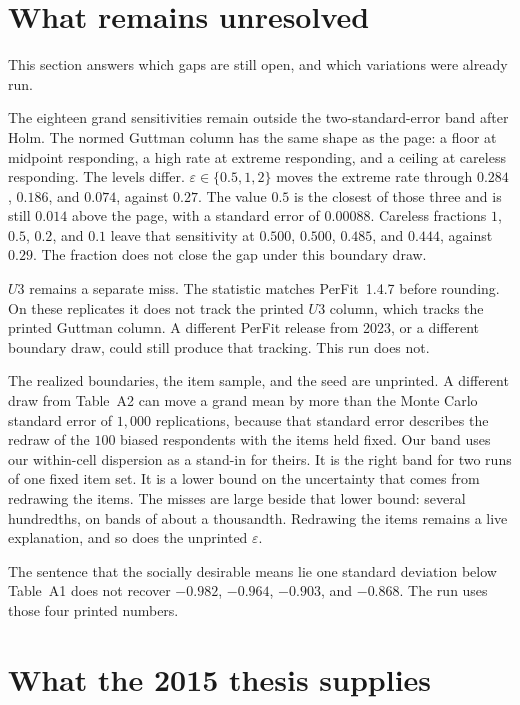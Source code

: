 \documentclass[11pt]{article}
\begin{document}
\section{What remains unresolved}
\label{sec:open}

This section answers which gaps are still open, and which variations
were already run.

The eighteen grand sensitivities remain outside the two-standard-error
band after Holm.
The normed Guttman column has the same shape as the page: a floor at
midpoint responding, a high rate at extreme responding, and a ceiling
at careless responding.
The levels differ.
\(\varepsilon\in\{0.5, 1, 2\}\) moves the extreme rate through
\(0.284\), \(0.186\), and \(0.074\), against \(0.27\).
The value \(0.5\) is the closest of those three and is still \(0.014\)
above the page, with a standard error of \(0.00088\).
Careless fractions \(1\), \(0.5\), \(0.2\), and \(0.1\) leave that
sensitivity at \(0.500\), \(0.500\), \(0.485\), and \(0.444\), against
\(0.29\).
The fraction does not close the gap under this boundary draw.

\(U3\) remains a separate miss.
The statistic matches PerFit~1.4.7 before rounding.
On these replicates it does not track the printed \(U3\) column, which
tracks the printed Guttman column.
A different PerFit release from 2023, or a different boundary draw,
could still produce that tracking.
This run does not.

The realized boundaries, the item sample, and the seed are unprinted.
A different draw from Table~A2 can move a grand mean by more than the
Monte Carlo standard error of \(1{,}000\) replications, because that
standard error describes the redraw of the \(100\) biased respondents
with the items held fixed.
Our band uses our within-cell dispersion as a stand-in for theirs.
It is the right band for two runs of one fixed item set.
It is a lower bound on the uncertainty that comes from redrawing the
items.
The misses are large beside that lower bound: several hundredths, on
bands of about a thousandth.
Redrawing the items remains a live explanation, and so does the
unprinted \(\varepsilon\).

The sentence that the socially desirable means lie one standard
deviation below Table~A1 does not recover \(-0.982\), \(-0.964\),
\(-0.903\), and \(-0.868\).
The run uses those four printed numbers.

\section{What the 2015 thesis supplies}
\label{sec:thesis}
\end{document}
